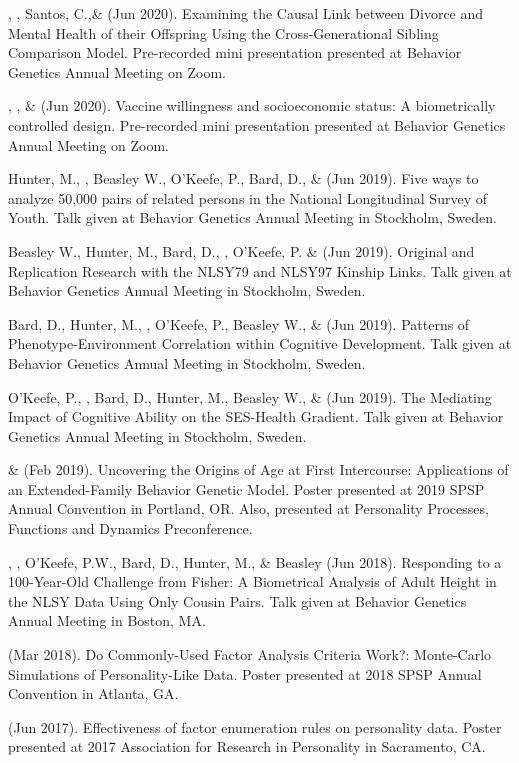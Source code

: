 \begin{etaremune}
%
\item \kl, \jt, Santos, C.,\noteB \& \meb (Jun 2020). Examining the Causal Link between Divorce and Mental Health of their Offspring Using the Cross-Generational Sibling Comparison Model. Pre-recorded mini presentation presented at Behavior Genetics Annual Meeting on Zoom.
%
\item \jt, \kl, \& \meb (Jun 2020). Vaccine willingness and socioeconomic status: A biometrically controlled design. Pre-recorded mini presentation presented at Behavior Genetics Annual Meeting on Zoom.
%
\item Hunter, M., \meb, Beasley W., O'Keefe, P.,  Bard, D., \& \Joe (Jun 2019). Five ways to analyze 50,000 pairs of related persons in the National Longitudinal Survey of Youth. Talk given at Behavior Genetics Annual Meeting in Stockholm, Sweden. 
%
\item Beasley W., Hunter, M., Bard, D., \meb, O'Keefe, P. \&  \Joe (Jun 2019). Original and Replication Research with the NLSY79 and NLSY97 Kinship Links. Talk given at Behavior Genetics Annual Meeting in Stockholm, Sweden. 
%
\item Bard, D., Hunter, M., \meb, O'Keefe, P., Beasley W.,  \&  \Joe (Jun 2019). Patterns of Phenotype-Environment Correlation within Cognitive Development. Talk given at Behavior Genetics Annual Meeting in Stockholm, Sweden. 
%
\item O'Keefe, P., \meb, Bard, D., Hunter, M.,  Beasley W.,  \&  \Joe (Jun 2019). The Mediating Impact of Cognitive Ability on the SES-Health Gradient. Talk given at Behavior Genetics Annual Meeting in Stockholm, Sweden. 
%
\item \meb \& \Joe (Feb 2019). Uncovering the Origins of Age at First Intercourse: Applications of an Extended-Family Behavior Genetic Model. Poster presented at 2019 SPSP Annual Convention in Portland, OR. Also, presented at Personality Processes, Functions and Dynamics Preconference.
%
\item\Joe, \meb, O'Keefe, P.W., Bard, D., Hunter, M., \& Beasley (Jun 2018). Responding to a 100-Year-Old Challenge from Fisher: A Biometrical Analysis of Adult Height in the NLSY Data Using Only Cousin Pairs. Talk given at Behavior Genetics Annual Meeting in Boston, MA. 
%
\item\meb (Mar 2018). Do Commonly-Used Factor Analysis Criteria Work?: Monte-Carlo Simulations of Personality-Like Data. Poster presented at 2018 SPSP Annual Convention in Atlanta, GA. 
%
\item\meb (Jun 2017). Effectiveness of factor enumeration rules on personality data. Poster presented at 2017 Association for Research in Personality in Sacramento, CA.

\end{etaremune}
